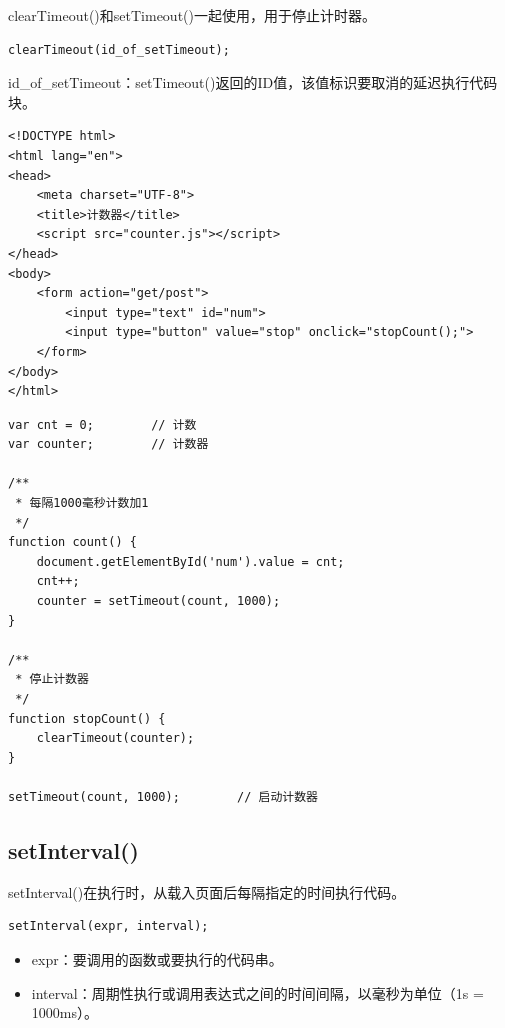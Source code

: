 clearTimeout()和setTimeout()一起使用，用于停止计时器。 \\

\begin{lstlisting}[style=htmlcssjs]
clearTimeout(id_of_setTimeout);
\end{lstlisting}

id\_of\_setTimeout：setTimeout()返回的ID值，该值标识要取消的延迟执行代码块。 \\


\begin{lstlisting}[style=htmlcssjs, title=counter.html]
<!DOCTYPE html>
<html lang="en">
<head>
    <meta charset="UTF-8">
    <title>计数器</title>
    <script src="counter.js"></script>
</head>
<body>
    <form action="get/post">
        <input type="text" id="num">
        <input type="button" value="stop" onclick="stopCount();">
    </form>
</body>
</html>
\end{lstlisting}

\begin{lstlisting}[style=htmlcssjs, title=counter.js]
var cnt = 0;        // 计数
var counter;        // 计数器

/**
 * 每隔1000毫秒计数加1
 */
function count() {
    document.getElementById('num').value = cnt;
    cnt++;
    counter = setTimeout(count, 1000);
}

/**
 * 停止计数器
 */
function stopCount() {
    clearTimeout(counter);
}

setTimeout(count, 1000);        // 启动计数器
\end{lstlisting}

\subsection{setInterval()}

setInterval()在执行时，从载入页面后每隔指定的时间执行代码。 \\

\begin{lstlisting}[style=htmlcssjs]
setInterval(expr, interval);
\end{lstlisting}

\begin{itemize}
	\item expr：要调用的函数或要执行的代码串。
	\item interval：周期性执行或调用表达式之间的时间间隔，以毫秒为单位（1s = 1000ms）。
\end{itemize}


